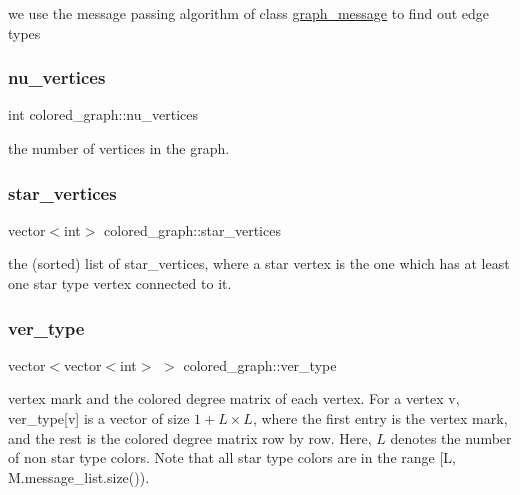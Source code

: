 we use the message passing algorithm of class \hyperlink{classgraph__message}{graph\+\_\+message} to find out edge types 

\mbox{\label{classcolored__graph_a90ece8eb1fec52f3f41549ab527c1d5b}} 
\subsubsection{\texorpdfstring{nu\+\_\+vertices}{nu\_vertices}}
{\footnotesize\ttfamily int colored\+\_\+graph\+::nu\+\_\+vertices}



the number of vertices in the graph. 

\mbox{\label{classcolored__graph_ab7ee8d717abde7ad7467ef695038f574}} 
\subsubsection{\texorpdfstring{star\+\_\+vertices}{star\_vertices}}
{\footnotesize\ttfamily vector$<$int$>$ colored\+\_\+graph\+::star\+\_\+vertices}



the (sorted) list of star\+\_\+vertices, where a star vertex is the one which has at least one star type vertex connected to it. 

\mbox{\label{classcolored__graph_a2cc32e7146fa3319f83cfa940f5e1be4}} 
\subsubsection{\texorpdfstring{ver\+\_\+type}{ver\_type}}
{\footnotesize\ttfamily vector$<$vector$<$int$>$ $>$ colored\+\_\+graph\+::ver\+\_\+type}



vertex mark and the colored degree matrix of each vertex. For a vertex v, ver\+\_\+type\mbox{[}v\mbox{]} is a vector of size $1 + L \times L$, where the first entry is the vertex mark, and the rest is the colored degree matrix row by row. Here, $L$ denotes the number of non star type colors. Note that all star type colors are in the range \mbox{[}L, M.\+message\+\_\+list.\+size()). 


